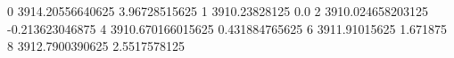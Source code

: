 0 3914.20556640625 3.96728515625
1 3910.23828125 0.0
2 3910.024658203125 -0.213623046875
4 3910.670166015625 0.431884765625
6 3911.91015625 1.671875
8 3912.7900390625 2.5517578125
